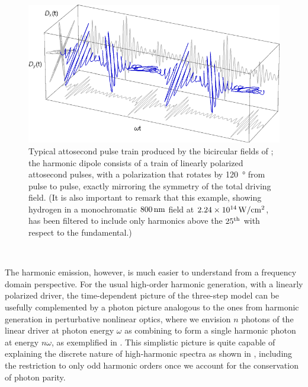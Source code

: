 \begin{figure}[h!]
  \centering
  \includegraphics[scale=1]{8-Spin-HHG/Figures/figure8C.pdf}
  \caption[
  Typical attosecond pulse train produced by bicircular fields: a train of linearly polarized attosecond bursts, rotated by $\SI{120}{\degree}$ from each other
  ]{
  Typical attosecond pulse train produced by the bicircular fields of ; the harmonic dipole consists of a train of linearly polarized attosecond pulses, with a polarization that rotates by \SI{120}{\degree} from pulse to pulse, exactly mirroring the symmetry of the total driving field.
  (It is also important to remark that this example, showing hydrogen in a monochromatic $\SI{800}{nm}$ field at $\SI{2.24e14}{W/cm^2}$, has been filtered to include only harmonics above the $25^{\rm th}$ with respect to the fundamental.)
  }
  \label{f8-typical-bicircular-apt}
  
  \vspace{0mm}
  
\end{figure}

\vfill

$\quad$





The harmonic emission, however, is much easier to understand from a frequency domain perspective. For the usual high-order harmonic generation, with a linearly polarized driver, the time-dependent picture of the three-step model can be usefully complemented by a photon picture analogous to the ones from harmonic generation in perturbative nonlinear optics, where we envision $n$ photons of the linear driver at photon energy $\omega$ as combining to form a single harmonic photon at energy $n\omega$, as exemplified in . This simplistic picture is quite capable of explaining the discrete nature of high-harmonic spectra as shown in , including the restriction to only odd harmonic orders once we account for the conservation of photon parity.






